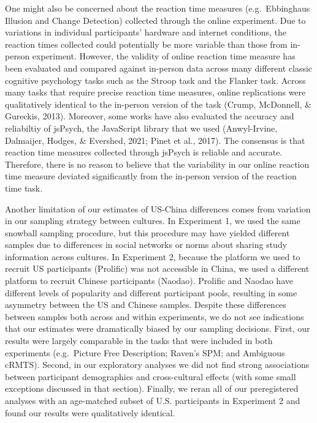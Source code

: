 \documentclass[
  man,floatsintext]{apa6}
\begin{document}
One might also be concerned about the reaction time measures (e.g.~Ebbinghaus Illusion and Change Detection) collected through the online experiment. Due to variations in individual participants' hardware and internet conditions, the reaction times collected could potentially be more variable than those from in-person experiment. However, the validity of online reaction time measure has been evaluated and compared against in-person data across many different classic cognitive psychology tasks such as the Stroop task and the Flanker task. Across many tasks that require precise reaction time measures, online replications were qualitatively identical to the in-person version of the task (Crump, McDonnell, \& Gureckis, 2013). Moreover, some works have also evaluated the accuracy and reliabiltiy of jsPsych, the JavaScript library that we used (Anwyl-Irvine, Dalmaijer, Hodges, \& Evershed, 2021; Pinet et al., 2017). The consensus is that reaction time measures collected through jsPsych is reliable and accurate. Therefore, there is no reason to believe that the variability in our online reaction time measure deviated significantly from the in-person version of the reaction time task.

Another limitation of our estimates of US-China differences comes from variation in our sampling strategy between cultures. In Experiment 1, we used the same snowball sampling procedure, but this procedure may have yielded different samples due to differences in social networks or norms about sharing study information across cultures. In Experiment 2, because the platform we used to recruit US participants (Prolific) was not accessible in China, we used a different platform to recruit Chinese participants (Naodao). Prolific and Naodao have different levels of popularity and different participant pools, resulting in some asymmetry between the US and Chinese samples. Despite these differences between samples both across and within experiments, we do not see indications that our estimates were dramatically biased by our sampling decisions. First, our results were largely comparable in the tasks that were included in both experiments (e.g.~Picture Free Description; Raven's SPM; and Ambiguous cRMTS). Second, in our exploratory analyses we did not find strong associations between participant demographics and cross-cultural effects (with some small exceptions discussed in that section). Finally, we reran all of our preregistered analyses with an age-matched subset of U.S. participants in Experiment 2 and found our results were qualitatively identical.
\end{document}
